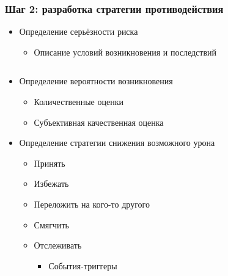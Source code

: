 \documentclass{../../slides-style}
\begin{document}
    \begin{frame}
        \frametitle{Шаг 2: разработка стратегии противодействия}
        \begin{itemize}
            \item Определение серьёзности риска
            \begin{itemize}
                \item Описание условий возникновения и последствий
            \end{itemize}
        \end{itemize}
        \begin{columns}
            \begin{column}{0.6\textwidth}
                \begin{itemize}
                    \item Определение вероятности возникновения
                    \begin{itemize}
                        \item Количественные оценки
                        \item Субъективная качественная оценка
                    \end{itemize}
                    \item Определение стратегии снижения возможного урона
                    \begin{itemize}
                        \item Принять
                        \item Избежать
                        \item Переложить на кого-то другого
                        \item Смягчить
                        \item Отслеживать
                        \begin{itemize}
                            \item События-триггеры
                        \end{itemize}
                    \end{itemize}
                \end{itemize}
            \end{column}
            \begin{column}{0.4\textwidth}
                \begin{center}

\end{center}
\end{column}
\end{columns}
\end{frame}
\end{document}
